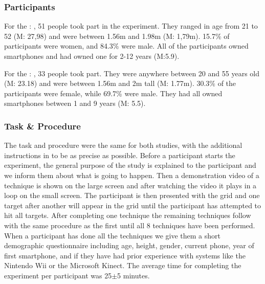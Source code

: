\subsubsection{Participants}
For the \studyone: \target, 51 people took part in the experiment. They ranged in age from 21 to 52 (M: 27,98) and were between 1.56m and 1.98m (M: 1,79m). 
15.7\% of participants were women, and 84.3\% were male.
All of the participants owned smartphones and had owned one for 2-12 years (M:5.9).

For the \studytwo: \accuracy, 33 people took part. They were anywhere between 20 and 55 years old (M: 23.18) and were between 1.56m and 2m tall (M: 1.77m).
30.3\% of the participants were female, while 69.7\% were male.
They had all owned smartphones between 1 and 9 years (M: 5.5).

\subsubsection{Task \& Procedure} \label{sec:procedure}
The task and procedure were the same for both studies, with the additional instructions in \studytwo to be as precise as possible.
Before a participant starts the experiment, the general purpose of the study is explained to the participant and we inform them about what is going to happen.
Then a demonstration video of a technique is shown on the large screen and after watching the video it plays in a loop on the small screen.
The participant is then presented with the grid and one target after another will appear in the grid until the participant has attempted to hit all targets.
After completing one technique the remaining techniques follow with the same procedure as the first until all 8 techniques have been performed.
When a participant has done all the techniques we give them a short demographic questionnaire including age, height, gender, current phone, year of first smartphone, and if they have had prior experience with systems like the Nintendo Wii or the Microsoft Kinect.
The average time for completing the experiment per participant was 25$\pm$5 minutes. 